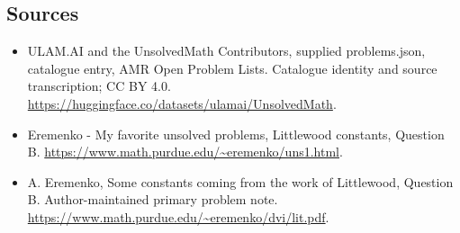 \documentclass[11pt,a4paper]{article}
\begin{document}
\subsection{Sources}
\begin{itemize}
\item[S1] ULAM.AI and the UnsolvedMath Contributors, supplied problems.json, catalogue entry, AMR Open Problem Lists. Catalogue identity and source transcription; CC BY 4.0.
\url{https://huggingface.co/datasets/ulamai/UnsolvedMath}.
\item[S2] Eremenko - My favorite unsolved problems, Littlewood constants, Question B. 
\url{https://www.math.purdue.edu/~eremenko/uns1.html}.
\item[S3] A. Eremenko, Some constants coming from the work of Littlewood, Question B. Author-maintained primary problem note.
\url{https://www.math.purdue.edu/~eremenko/dvi/lit.pdf}.
\end{itemize}
\end{document}
